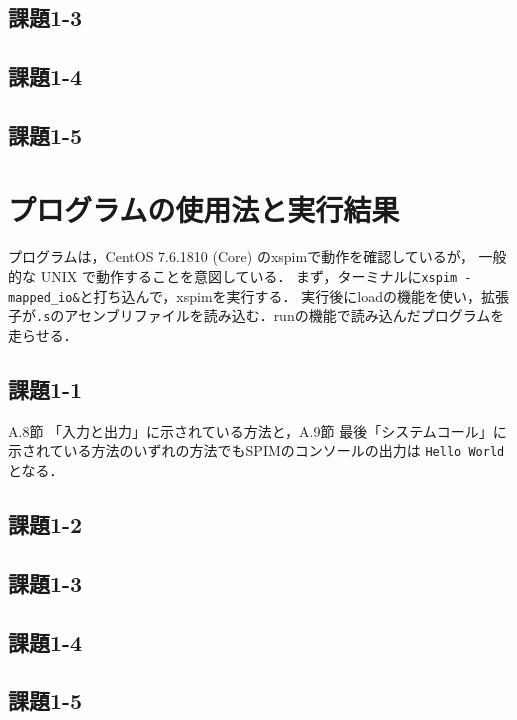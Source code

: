 \subsection{課題1-3}


\subsection{課題1-4}


\subsection{課題1-5}



\section{プログラムの使用法と実行結果}\label{sec:howresult}

プログラムは，CentOS 7.6.1810 (Core) のxspimで動作を確認しているが，
一般的な UNIX で動作することを意図している．
まず，ターミナルに\verb|xspim -mapped_io&|と打ち込んで，xspimを実行する．
実行後にloadの機能を使い，拡張子が\verb|.s|のアセンブリファイルを読み込む．runの機能で読み込んだプログラムを走らせる．

\subsection{課題1-1}
A.8節 「入力と出力」に示されている方法と，A.9節 最後「システムコール」に示されている方法のいずれの方法でもSPIMのコンソールの出力は
\verb|Hello World|となる．
\subsection{課題1-2}


\subsection{課題1-3}


\subsection{課題1-4}


\subsection{課題1-5}


